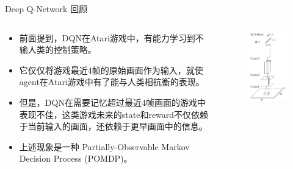\documentclass[10pt]{beamer}
\begin{document}
	\begin{frame}{Deep Q-Network 回顾}
		\begin{columns}
			\begin{column}{.6\linewidth}
				\begin{itemize}
					\item 前面提到，DQN在Atari游戏中，有能力学习到不输人类的控制策略。
					\item 它仅仅将游戏最近4帧的原始画面作为输入，就使agent在Atari游戏中有了能与人类相抗衡的表现。
					\item 但是，DQN在需要记忆\alert{超过最近4帧}画面的游戏中表现不佳，这类游戏未来的state和reward不仅依赖于当前输入的画面，还依赖于更早画面中的信息。
					\item 上述现象是一种 Partially-Observable Markov Decision Process (POMDP)。
				\end{itemize}
			\end{column}
			\begin{column}{.4\linewidth}
				\begin{figure}
					\centering
					\includegraphics[width=0.9\linewidth]{pictures/dqn-architecture-2}
					\caption{}
					\label{fig:dqn-architecture-2}
				\end{figure}
				
			\end{column}
		\end{columns}
		
	\end{frame}
\end{document}
